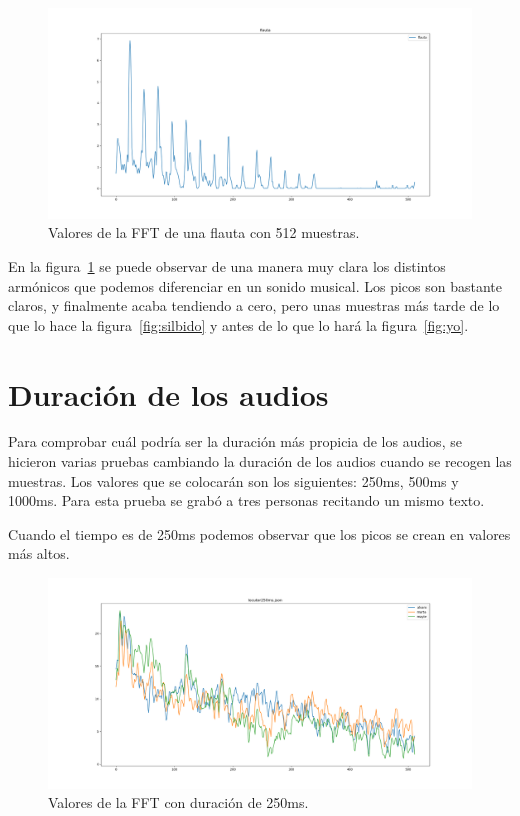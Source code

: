 \documentclass[a4paper, 12pt]{book}
\begin{document}
\begin{figure}
	\centering
	\includegraphics[width=12cm, keepaspectratio]{img/flauta512.png}
	\caption{Valores de la FFT de una flauta con 512 muestras.}\label{fig:flauta}
\end{figure}

En la figura~\ref{fig:flauta} se puede observar de una manera muy clara los distintos armónicos que podemos diferenciar en un sonido musical. Los picos son bastante claros, y finalmente acaba tendiendo a cero, pero unas muestras más tarde de lo que lo hace la figura~\ref{fig:silbido} y antes de lo que lo hará la figura~\ref{fig:yo}.


\section{Duración de los audios}
\label{sec:duracion-audio}

Para comprobar cuál podría ser la duración más propicia de los audios, se hicieron varias pruebas cambiando la duración de los audios cuando se recogen las muestras. Los valores que se colocarán son los siguientes: 250ms, 500ms y 1000ms. Para esta prueba se grabó a tres personas recitando un mismo texto.

Cuando el tiempo es de 250ms podemos observar que los picos se crean en valores más altos.

\begin{figure}
	\centering
	\includegraphics[width=12cm, keepaspectratio]{img/locutor250ms.png}
	\caption{Valores de la FFT con duración de 250ms.}\label{fig:locutor250ms}
\end{figure}
\end{document}
